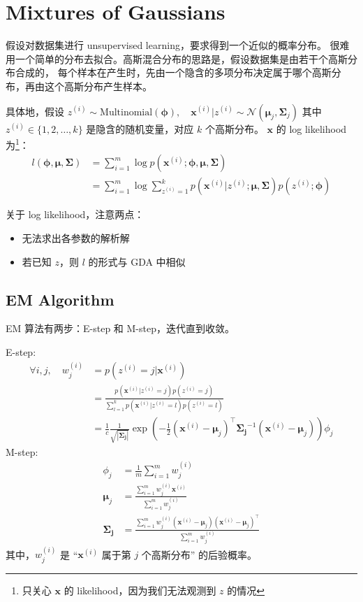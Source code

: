 \chapter{Mixtures of Gaussians}
	假设对数据集进行 unsupervised learning，要求得到一个近似的概率分布。
	很难用一个简单的分布去拟合。高斯混合分布的思路是，假设数据集是由若干个高斯分布合成的，
	每个样本在产生时，先由一个隐含的多项分布决定属于哪个高斯分布，再由这个高斯分布产生样本。
	
	具体地，假设 $ z^{(i)} \sim \text{Multinomial}(\bm{\phi}), \quad \bm{x}^{(i)} | z^{(i)} \sim \mathcal{N}(\bm{\mu}_j, \bm{\Sigma}_j) $
	其中 $ z^{(i)} \in \{ 1, 2, \ldots, k \} $ 是隐含的随机变量，对应 $ k $ 个高斯分布。
	$ \bm{x} $ 的 log likelihood 为\footnote{只关心 $ \bm{x} $ 的 likelihood，因为我们无法观测到 $ z $ 的情况}：
	\begin{align}
		l(\bm{\phi}, \bm{\mu}, \bm{\Sigma}) &= \sum_{i=1}^{m} \log p(\bm{x}^{(i)}; \bm{\phi}, \bm{\mu}, \bm{\Sigma}) \\
		&= \sum_{i=1}^{m} \log \sum_{z^{(i)} = 1}^{k} p(\bm{x}^{(i)} | z^{(i)}; \bm{\mu}, \bm{\Sigma}) p(z^{(i)}; \bm{\phi})
	\end{align}
	
	关于 log likelihood，注意两点：
	\begin{itemize}
		\item 无法求出各参数的解析解
		\item 若已知 $ z $，则 $ l $ 的形式与 GDA 中相似
	\end{itemize}

	\section{EM Algorithm}
		EM 算法有两步：E-step 和 M-step，迭代直到收敛。
		
		E-step:
		\begin{align}
			\forall i, j, \quad w_j^{(i)} &= p(z^{(i)} = j | \bm{x}^{(i)}) \\ 
			&= \frac{p(\bm{x}^{(i)} | z^{(i)} = j) p(z^{(i)}=j)}{\sum_{l=1}^{k} p(\bm{x}^{(i)} | z^{(i)} = l) p(z^{(i)}=l)} \\
			&= \frac{1}{c} \frac{1}{\sqrt{| \bm{\Sigma_j} |}} \exp \left( - \frac{1}{2} (\bm{x}^{(i)} - \bm{\mu}_j)^\intercal \bm{\Sigma_j}^{-1} (\bm{x}^{(i)} - \bm{\mu}_j)  \right) \phi_j
		\end{align}
		M-step:
		\begin{align}
			\phi_j &= \frac{1}{m} \sum_{i=1}^{m} w_j^{(i)} \\
			\bm{\mu}_j &= \frac{\sum_{i=1}^{m} w_j^{(i)} \bm{x}^{(i)}} {\sum_{i=1}^{m} w_j^{(i)}} \\
			\bm{\Sigma_j} &= \frac{\sum_{i=1}^{m} w_j^{(i)} (\bm{x}^{(i)} - \bm{\mu}_j)(\bm{x}^{(i)} - \bm{\mu}_j)^\intercal} {\sum_{i=1}^{m} w_j^{(i)}}
		\end{align}
		其中，$ w_j^{(i)} $ 是 “$ \bm{x}^{(i)} $ 属于第 $ j $ 个高斯分布” 的后验概率。

	